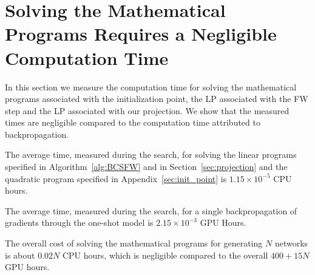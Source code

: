 \documentclass[dvipsnames,table,xcdraw]{article}
\begin{document}
\section{Solving the Mathematical Programs Requires a Negligible Computation Time}
In this section we measure the computation time for solving the mathematical programs associated with the initialization point, the LP associated with the FW step and the LP associated with our projection.
We show that the measured times are negligible compared to the computation time attributed to backpropagation.

The average time, measured during the search, for solving the linear programs specified in Algorithm~\ref{alg:BCSFW} and in Section~\ref{sec:projection} and the quadratic program specified in Appendix~\ref{sec:init_point} is $1.15\times 10^{-5}$ CPU hours.

The average time, measured during the search, for a single backpropagation of gradients through the one-shot model is $2.15\times 10^{-3}$ GPU Hours.

The overall cost of solving the mathematical programs for generating $N$ networks is about $0.02N$ CPU hours, which is negligible compared to the overall $400 + 15N$ GPU hours.
 
\end{document}
